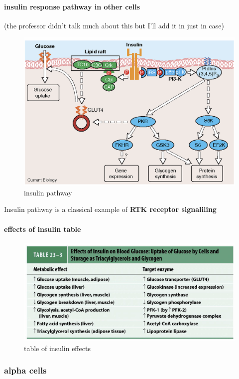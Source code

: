 \documentclass[../main.tex]{subfiles}
\begin{document}
\paragraph{insulin response pathway in other cells}
(the professor didn't talk much about this but I'll add it in just in case)
\begin{figure}[H]
    \centering
    \includegraphics[width=0.7\linewidth]{insulinPathway.png}
    \caption{insulin pathway}
    \label{fig:enter-label}
\end{figure}
Insulin pathway is a classical example of\textbf{ RTK receptor signaliling}
\paragraph{effects of insulin table}
\begin{figure}[H]
    \centering
    \includegraphics[width=\linewidth]{Sum_BC_II//lectures//bcll12/insulinTable.png}
    \caption{table of insulin effects}
    \label{fig:enter-label}
\end{figure}

\subsubsection{alpha cells}
\end{document}
